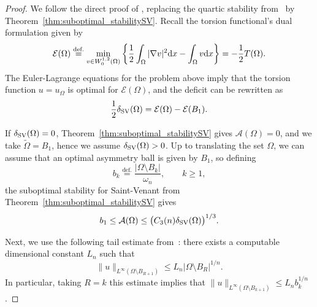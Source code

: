 \documentclass[11pt]{amsart}
\theoremstyle{plain}
\theoremstyle{definition}
\newcommand{\eqdef}{\overset{\text{def.}}{=}}
\def\dd{{\rm d}}
\begin{document}
\begin{proof}
We follow the direct proof of \cite[Lemma~5.3]{brasco2015faber}, replacing the quartic stability from~\cite{FuscoMaggiPratelli2009Eigenvalue} by Theorem~\ref{thm:suboptimal_stabilitySV}. Recall the torsion functional's dual formulation given by
\[
 \mathcal{E}(\Omega)\eqdef\min_{v\in W_0^{1,2}(\Omega)}
 \left\{\frac{1}{2}\int_\Omega|\nabla v|^2\dd x-\int_\Omega v\dd x\right\}
 =-\frac{1}{2}T(\Omega).
\]
The Euler-Lagrange equations for the problem above imply that the torsion function $u = u_\Omega$ is optimal for $\mathcal{E}(\Omega)$, and the deficit can be rewritten as 
\[
  \frac{1}{2}\delta_{\rm SV}(\Omega) 
  = 
  \mathcal{E}(\Omega) - \mathcal{E}(B_1).
\]

If $\delta_{\rm SV}(\Omega)=0$, Theorem~\ref{thm:suboptimal_stabilitySV} gives
$\mathcal A(\Omega)=0$, and we take $\tilde\Omega=B_1$, hence we assume $\delta_{\rm SV}(\Omega)>0$. Up to translating the set $\Omega$, we can assume that an optimal asymmetry ball is given by $B_1$, so defining 
\[
 b_k\eqdef\frac{|\Omega\setminus B_k|}{\omega_n},\qquad k\ge1,
\]
the suboptimal stability for Saint-Venant from Theorem~\ref{thm:suboptimal_stabilitySV} gives
\begin{equation}\label{eq.truncation_seed}
 b_1\le\mathcal A(\Omega)
 \le \bigl(C_3(n)\delta_{\rm SV}(\Omega)\bigr)^{1/3}.
\end{equation}

Next, we use the following tail estimate from~\cite[Lemma~5.1]{brasco2015faber}: there exists a computable dimensional constant $L_n$ such that 
\begin{equation}\label{eq.torsion_tail}
 \|u\|_{L^\infty(\Omega\setminus B_{R+1})}
 \le L_n |\Omega \setminus B_R|^{1/n}. 
\end{equation}
In particular, taking $R = k$ this estimate implies that $\|u\|_{L^\infty(\Omega\setminus B_{k+1})} \le L_n b_k^{1/n}$. 


\end{proof}
\end{document}
